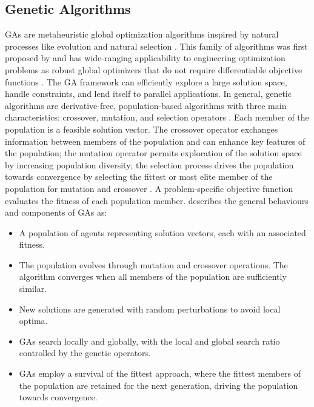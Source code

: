 \FloatBarrier
\subsection{Genetic Algorithms}
\label{subsec:01genetic}

\Glspl{GA} are metaheuristic global optimization algorithms inspired by natural processes like evolution and natural selection \citep{cui2024applications}. This family of algorithms was first proposed by \cite{holland1992genetic} and has wide-ranging applicability to engineering optimization problems as robust global optimizers that do not require differentiable objective functions \citep{carbas2021nature}. The \gls{GA} framework can efficiently explore a large solution space, handle constraints, and lend itself to parallel applications. In general, genetic algorithms are derivative-free, population-based algorithms with three main characteristics: crossover, mutation, and selection operators \citep{yang2018nature}. Each member of the population is a feasible solution vector. The crossover operator exchanges information between members of the population and can enhance key features of the population; the mutation operator permits exploration of the solution space by increasing population diversity; the selection process drives the population towards convergence by selecting the fittest or most elite member of the population for mutation and crossover \citep{yang2018nature}. A problem-specific objective function evaluates the fitness of each population member. \cite{yang2018nature} describes the general behaviours and components of \glspl{GA} as:
\begin{itemize}[noitemsep]
    \item A population of agents representing solution vectors, each with an associated fitness.
    \item The population evolves through mutation and crossover operations. The algorithm converges when all members of the population are sufficiently similar.
    \item New solutions are generated with random perturbations to avoid local optima.
    \item \Glspl{GA} search locally and globally, with the local and global search ratio controlled by the genetic operators.
    \item \Glspl{GA} employ a survival of the fittest approach, where the fittest members of the population are retained for the next generation, driving the population towards convergence.
\end{itemize}


